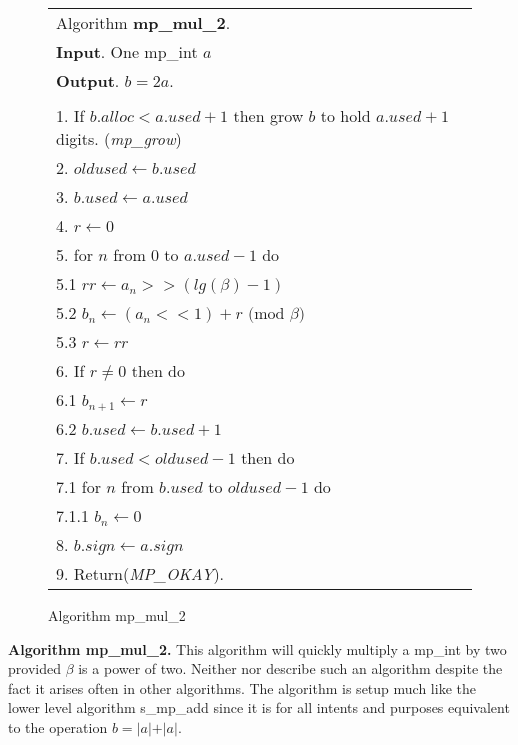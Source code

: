 \documentclass[b5paper]{book}
\begin{document}
\newpage\begin{figure}[!here]
\begin{small}
\begin{center}
\begin{tabular}{l}
\hline Algorithm \textbf{mp\_mul\_2}. \\
\textbf{Input}.   One mp\_int $a$ \\
\textbf{Output}.  $b = 2a$. \\
\hline \\
1.  If $b.alloc < a.used + 1$ then grow $b$ to hold $a.used + 1$ digits.  (\textit{mp\_grow}) \\
2.  $oldused \leftarrow b.used$ \\
3.  $b.used \leftarrow a.used$ \\
4.  $r \leftarrow 0$ \\
5.  for $n$ from 0 to $a.used - 1$ do \\
\hspace{3mm}5.1  $rr \leftarrow a_n >> (lg(\beta) - 1)$ \\
\hspace{3mm}5.2  $b_n \leftarrow (a_n << 1) + r \mbox{ (mod }\beta\mbox{)}$ \\
\hspace{3mm}5.3  $r \leftarrow rr$ \\
6.  If $r \ne 0$ then do \\
\hspace{3mm}6.1  $b_{n + 1} \leftarrow r$ \\
\hspace{3mm}6.2  $b.used \leftarrow b.used + 1$ \\
7.  If $b.used < oldused - 1$ then do \\
\hspace{3mm}7.1  for $n$ from $b.used$ to $oldused - 1$ do \\
\hspace{6mm}7.1.1  $b_n \leftarrow 0$ \\
8.  $b.sign \leftarrow a.sign$ \\
9.  Return(\textit{MP\_OKAY}).\\
\hline
\end{tabular}
\end{center}
\end{small}
\caption{Algorithm mp\_mul\_2}
\end{figure}

\textbf{Algorithm mp\_mul\_2.}
This algorithm will quickly multiply a mp\_int by two provided $\beta$ is a power of two.  Neither \cite{TAOCPV2} nor \cite{HAC} describe such 
an algorithm despite the fact it arises often in other algorithms.  The algorithm is setup much like the lower level algorithm s\_mp\_add since 
it is for all intents and purposes equivalent to the operation $b = \vert a \vert + \vert a \vert$.  
\end{document}
